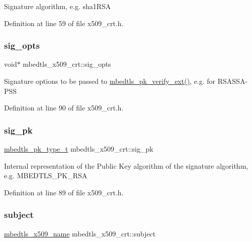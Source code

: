 Signature algorithm, e.\+g. sha1\+R\+SA 

Definition at line 59 of file x509\+\_\+crt.\+h.

\mbox{\label{structmbedtls__x509__crt_a67c497ed6535050997c014507a866e9e}} 
\subsubsection{\texorpdfstring{sig\+\_\+opts}{sig\_opts}}
{\footnotesize\ttfamily void$\ast$ mbedtls\+\_\+x509\+\_\+crt\+::sig\+\_\+opts}

Signature options to be passed to \mbox{\hyperlink{pk_8h_a81f0c5e40b839f5eca676c2c2752036f}{mbedtls\+\_\+pk\+\_\+verify\+\_\+ext()}}, e.\+g. for R\+S\+A\+S\+S\+A-\/\+P\+SS 

Definition at line 90 of file x509\+\_\+crt.\+h.

\mbox{\label{structmbedtls__x509__crt_a65d5d20352a08c77e173808fde1f8660}} 
\subsubsection{\texorpdfstring{sig\+\_\+pk}{sig\_pk}}
{\footnotesize\ttfamily \mbox{\hyperlink{pk_8h_a3fe41eff5605ae727eb9d28dad297020}{mbedtls\+\_\+pk\+\_\+type\+\_\+t}} mbedtls\+\_\+x509\+\_\+crt\+::sig\+\_\+pk}

Internal representation of the Public Key algorithm of the signature algorithm, e.\+g. M\+B\+E\+D\+T\+L\+S\+\_\+\+P\+K\+\_\+\+R\+SA 

Definition at line 89 of file x509\+\_\+crt.\+h.

\mbox{\label{structmbedtls__x509__crt_a773e92423092ab65e5e50031bd9663a5}} 
\subsubsection{\texorpdfstring{subject}{subject}}
{\footnotesize\ttfamily \mbox{\hyperlink{group__x509__module_ga2272228c7776102328df31623af3168c}{mbedtls\+\_\+x509\+\_\+name}} mbedtls\+\_\+x509\+\_\+crt\+::subject}

